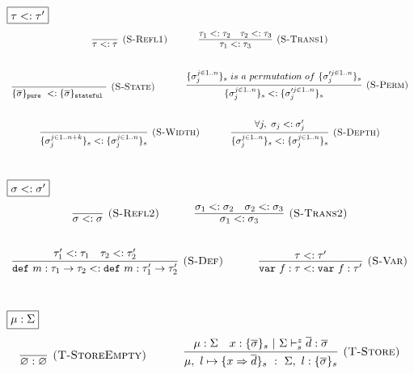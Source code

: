 \documentclass{llncs}
\newcommand{\keywadj}[1]{\mathtt{#1}}
\newcommand{\keyw}[1]{\keywadj{#1}~}
\begin{document}
$\fbox{$\tau <: \tau'$}$
\[
\begin{array}{c}
\infer[\textsc{(S-Refl1)}]
  {\tau <:\tau}
  {}%
~~~~~~~~~~
\infer[\textsc{(S-Trans1)}]
  {\tau_1 <: \tau_3}
  {\tau_1 <: \tau_2 & \tau_2 <: \tau_3}\\[5ex]

\infer[\textsc{(S-State)}]
  {\{ \overline{\sigma} \}_{\keyw{pure}} <: \{ \overline{\sigma} \}_{\keyw{stateful}}}
  {}%
~~~~~~~~~~
\infer[\textsc{(S-Perm)}]
  {\{ \sigma_{j}^{j \in 1..n} \}_{s} <: \{ \sigma_{j}'^{j \in 1..n} \}_{s}}
  {\{ \sigma_{j}^{j \in 1..n} \}_{s}~is~a~permutation~of~\{ \sigma_{j}'^{j \in 1..n} \}_{s}}\\[5ex]

\infer[\textsc{(S-Width)}]
  {\{ \sigma_{j}^{j \in 1..n + k} \}_{s} <: \{ \sigma_{j}^{j \in 1..n} \}_{s}}
  {}%
~~~~~~~~~~
\infer[\textsc{(S-Depth)}]
  {\{ \sigma_{j}^{j \in 1..n} \}_{s} <: \{ \sigma_{j}^{j \in 1..n} \}_{s}}
  {\forall j,~\sigma_{j} <: \sigma_{j}'}\\[5ex]

\end{array}
\]

\vspace{-3pt}
$\fbox{$\sigma <: \sigma'$}$
\[
\begin{array}{c}
\infer[\textsc{(S-Refl2)}]
  {\sigma <: \sigma}
  {}%
~~~~~~~~~~
\infer[\textsc{(S-Trans2)}]
  {\sigma_{1} <: \sigma_{3}}
  {\sigma_{1} <: \sigma_{2} & \sigma_{2} <: \sigma_{3}}\\[5ex]

\infer[\textsc{(S-Def)}]
  {\keyw{def} m:\tau_1 \rightarrow \tau_2 <: \keyw{def} m:\tau_1' \rightarrow \tau_2'}
  {\tau_1' <: \tau_1 & \tau_2 <: \tau_2'}%
~~~~~~~~~~
\infer[\textsc{(S-Var)}]
  {\keyw{var} f:\tau <: \keyw{var} f:\tau'}
  {\tau <: \tau'}\\[5ex]  

\end{array}
\]

$\fbox{$\mu : \Sigma$}$
\[
\begin{array}{c}

\infer[\textsc{(T-StoreEmpty)}]
  {\varnothing : \varnothing}
  {}%
~~~~~~~~~~
\infer[\textsc{(T-Store)}]
  {\mu,~l \mapsto \{ x \Rightarrow \overline{d} \}_s~:~\Sigma,~l : \{ \overline{\sigma} \}_s}
  {\mu : \Sigma & x : \{ \overline{\sigma} \}_s~|~\Sigma \vdash^z_s \overline{d} : \overline{\sigma}}\\[5ex]

\end{array}
\]
\end{document}
